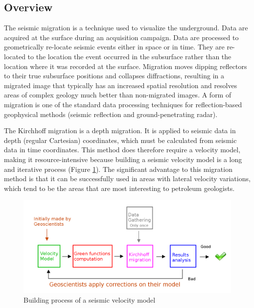 \subsection{Overview}
The seismic migration is a technique used to visualize the underground.
Data are acquired at the surface during an acquisition campaign.
Data are processed to geometrically re-locate seismic events either in space or in time.
They are re-located to the location the event occurred in the subsurface rather than the location where it was recorded at the surface.
Migration moves dipping reflectors to their true subsurface positions and collapses diffractions, resulting in a migrated image that typically has an increased spatial resolution and resolves areas of complex geology much better than non-migrated images.
A form of migration is one of the standard data processing techniques for reflection-based geophysical methods (seismic reflection and ground-penetrating radar).

The Kirchhoff migration \cite{PingY1995} \cite{PTSCS2009} is a depth migration.
It is applied to seismic data in depth (regular Cartesian) coordinates, which must be calculated from seismic data in time coordinates.
This method does therefore require a velocity model, making it resource-intensive because building a seismic velocity model is a long and iterative process (Figure \ref{fig:kirchhoff-process}).
The significant advantage to this migration method is that it can be successfully used in areas with lateral velocity variations, which tend to be the areas that are most interesting to petroleum geologists.

\begin{figure}[H]
	\centering
	\includegraphics[scale=0.25]{kirchhoff-process}
	\caption{Building process of a seismic velocity model \label{fig:kirchhoff-process}}
\end{figure}


